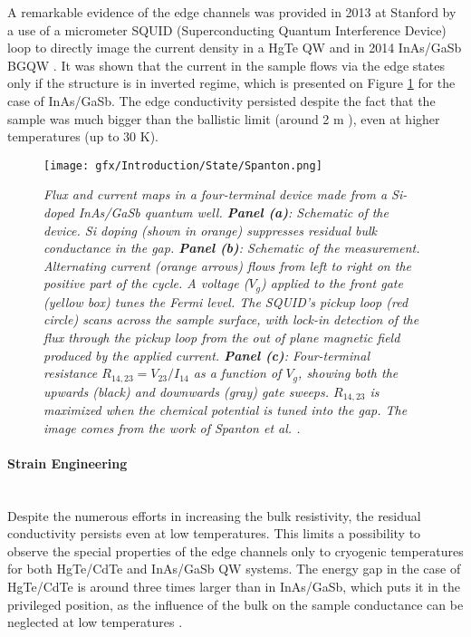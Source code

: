 \documentclass[titlepage,a4paper]{book}
\newcommand{\wciecie}{\quad\phantom{v}}
\newcommand{\myparagraph}[1]{\paragraph{#1}\mbox{}\\}
\begin{document}
A remarkable evidence of the edge channels was provided in 2013 at Stanford by a use of a micrometer SQUID (Superconducting Quantum Interference Device) loop \cite{Huber_State} to directly image the current density in a HgTe QW \cite{Nowack_State} and in 2014 InAs/GaSb BGQW \cite{Spanton_State}. It was shown that the current in the sample flows via the edge states only if the structure is in inverted regime, which is presented on Figure \ref{fig:Spanton_State} for the case of InAs/GaSb. The edge conductivity persisted despite the fact that the sample was much bigger than the ballistic limit (around 2 \textmu m \cite{Knez2_State}), even at higher temperatures (up to 30 K). 

\begin{figure}[ht]
	\centering
	\texttt{[image: gfx/Introduction/State/Spanton.png]}
	\vspace{-10pt}
	\caption{\textit{Flux and current maps in a four-terminal device made from a Si-doped InAs/GaSb quantum well. \textbf{Panel (a)}: Schematic of the device. Si doping (shown in orange) suppresses residual bulk conductance in the gap. \textbf{Panel (b)}: Schematic of the measurement. Alternating current (orange arrows) flows from left to right on the positive part of the cycle. A voltage ($V_g$) applied to the front gate (yellow box) tunes the Fermi level. The SQUID's pickup loop (red circle) scans across the sample surface, with lock-in detection of the flux through the pickup loop from the out of plane magnetic field produced by the applied current. \textbf{Panel (c)}: Four-terminal resistance $R_{14,23} = V_{23}/I_{14}$ as a function of $V_g$, showing both the upwards (black) and downwards (gray) gate sweeps. $R_{14,23}$ is maximized when the chemical potential is tuned into the gap. The image comes from the work of Spanton \textit{et al.} \cite{Spanton_State}.}}
	\label{fig:Spanton_State}
\end{figure} 

\myparagraph{Strain Engineering}
\wciecie
Despite the numerous efforts in increasing the bulk resistivity, the residual conductivity persists even at low temperatures. This limits a possibility to observe the special properties of the edge channels only to cryogenic temperatures for both HgTe/CdTe and InAs/GaSb QW systems. The energy gap in the case of HgTe/CdTe is around three times larger than in InAs/GaSb, which puts it in the privileged position, as the influence of the bulk on the sample conductance can be neglected at low temperatures \cite{Konig_Topology}. 
\end{document}
